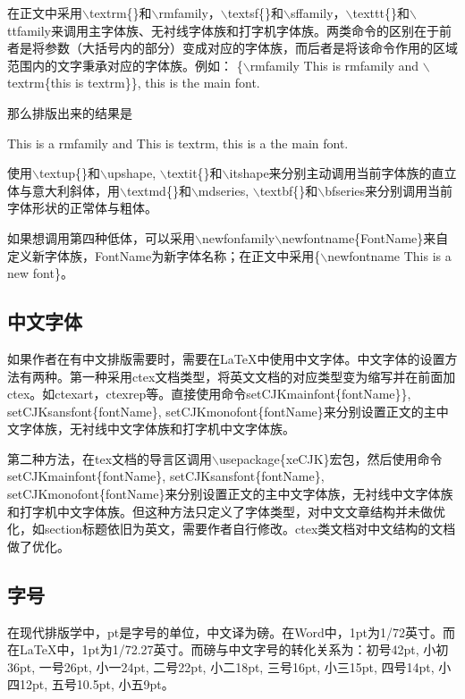 \documentclass[12pt]{book}
\begin{document}
在正文中采用$\backslash$textrm\{\}和$\backslash$rmfamily，$\backslash$textsf\{\}和$\backslash$sffamily，$\backslash$texttt\{\}和$\backslash$ttfamily来调用主字体族、无衬线字体族和打字机字体族。两类命令的区别在于前者是将参数（大括号内的部分）变成对应的字体族，而后者是将该命令作用的区域范围内的文字秉承对应的字体族。例如：
\{$\backslash$rmfamily This is rmfamily and $\backslash$textrm\{this is textrm\}\}, this is the main font.

那么排版出来的结果是

	{\rmfamily This is a rmfamily and \textrm{This is textrm}}, this is a the main font. %


使用$\backslash$textup\{\}和$\backslash$upshape, $\backslash$textit\{\}和$\backslash$itshape来分别主动调用当前字体族的直立体与意大利斜体，用$\backslash$textmd\{\}和$\backslash$mdseries, $\backslash$textbf\{\}和$\backslash$bfseries来分别调用当前字体形状的正常体与粗体。

如果想调用第四种低体，可以采用$\backslash$newfonfamily$\backslash$newfontname\{FontName\}来自定义新字体族，FontName为新字体名称；在正文中采用\{$\backslash$newfontname This is a new font\}。

\subsection{中文字体}

如果作者在有中文排版需要时，需要在\LaTeX{}中使用中文字体。中文字体的设置方法有两种。第一种采用ctex文档类型，将英文文档的对应类型变为缩写并在前面加ctex。如ctexart，ctexrep等。直接使用命令setCJKmainfont\{fontName\}\}, setCJKsansfont\{fontName\}, setCJKmonofont\{fontName\}来分别设置正文的主中文字体族，无衬线中文字体族和打字机中文字体族。

第二种方法，在tex文档的导言区调用$\backslash$usepackage\{xeCJK\}宏包，然后使用命令setCJKmainfont\{fontName\}, setCJKsansfont\{fontName\}, setCJKmonofont\{fontName\}来分别设置正文的主中文字体族，无衬线中文字体族和打字机中文字体族。但这种方法只定义了字体类型，对中文文章结构并未做优化，如section标题依旧为英文，需要作者自行修改。ctex类文档对中文结构的文档做了优化。

\subsection{字号}

在现代排版学中，pt是字号的单位，中文译为磅。在Word中，1pt为1/72英寸。而在LaTeX中，1pt为1/72.27英寸。而磅与中文字号的转化关系为：初号42pt, 小初36pt, 一号26pt, 小一24pt, 二号22pt, 小二18pt, 三号16pt, 小三15pt, 四号14pt, 小四12pt, 五号10.5pt, 小五9pt。
\end{document}
